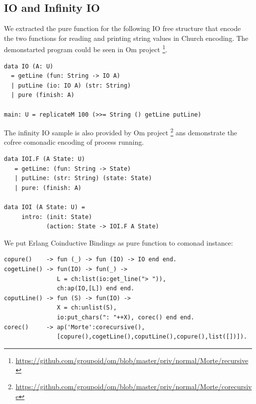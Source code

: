 \documentclass{article}
\begin{document}
\subsection{IO and Infinity IO}

We extracted the pure function for the following IO free structure
that encode the two functions for reading and printing string values in Church encoding.
The demonstarted program could be seen in Om project \footnote{\url{https://github.com/groupoid/om/blob/master/priv/normal/Morte/recursive}}.

\begin{lstlisting}[mathescape=true]
data IO (A: U)
  = getLine (fun: String -> IO A)
  | putLine (io: IO A) (str: String)
  | pure (finish: A)

main: U = replicateM 100 (>>= String () getLine putLine)
\end{lstlisting}

The infinity IO sample is also provided by Om project \footnote{\url{https://github.com/groupoid/om/blob/master/priv/normal/Morte/corecursive}}
ans demonstrate the cofree comonadic encoding of process running.

\begin{lstlisting}[mathescape=true]
data IOI.F (A State: U)
   = getLine: (fun: String -> State)
   | putLine: (str: String) (state: State)
   | pure: (finish: A)

data IOI (A State: U) =
     intro: (init: State)
            (action: State -> IOI.F A State)
\end{lstlisting}

We put Erlang Coinductive Bindings as pure function to comonad instance:

\begin{lstlisting}[mathescape=true]
copure()    -> fun (_) -> fun (IO) -> IO end end.
cogetLine() -> fun(IO) -> fun(_) ->
               L = ch:list(io:get_line("> ")),
               ch:ap(IO,[L]) end end.
coputLine() -> fun (S) -> fun(IO) ->
               X = ch:unlist(S),
               io:put_chars(": "++X), corec() end end.
corec()     -> ap('Morte':corecursive(),
               [copure(),cogetLine(),coputLine(),copure(),list([])]).
\end{lstlisting}

%
\end{document}
